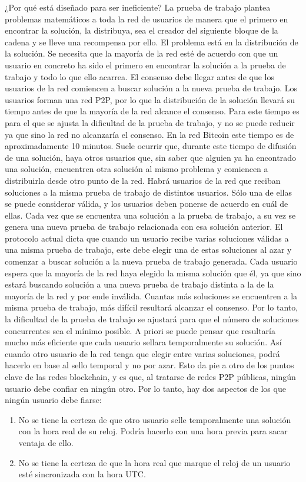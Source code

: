 ¿Por qué está diseñado para ser ineficiente? La prueba de trabajo plantea problemas matemáticos a toda la red de usuarios de manera que el primero en encontrar la solución, la distribuya, sea el creador del siguiente bloque de la cadena y se lleve una recompensa por ello. El problema está en la distribución de la solución. Se necesita que la mayoría de la red esté de acuerdo con que un usuario en concreto ha sido el primero en encontrar la solución a la prueba de trabajo y todo lo que ello acarrea. El consenso debe llegar antes de que los usuarios de la red comiencen a buscar solución a la nueva prueba de trabajo. Los usuarios forman una red P2P, por lo que la distribución de la solución llevará su tiempo antes de que la mayoría de la red alcance el consenso. Para este tiempo es para el que se ajusta la dificultad de la prueba de trabajo, y no se puede reducir ya que sino la red no alcanzaría el consenso. En la red Bitcoin este tiempo es de aproximadamente 10 minutos. Suele ocurrir que, durante este tiempo de difusión de una solución, haya otros usuarios que, sin saber que alguien ya ha encontrado una solución, encuentren otra solución al mismo problema y comiencen a distribuirla desde otro punto de la red. Habrá usuarios de la red que reciban soluciones a la misma prueba de trabajo de distintos usuarios. Sólo una de ellas se puede considerar válida, y los usuarios deben ponerse de acuerdo en cuál de ellas. Cada vez que se encuentra una solución a la prueba de trabajo, a su vez se genera una nueva prueba de trabajo relacionada con esa solución anterior. El protocolo actual dicta que cuando un usuario recibe varias soluciones válidas a una misma prueba de trabajo, este debe elegir una de estas soluciones al azar y comenzar a buscar solución a la nueva prueba de trabajo generada. Cada usuario espera que la mayoría de la red haya elegido la misma solución que él, ya que sino estará buscando solución a una nueva prueba de trabajo distinta a la de la mayoría de la red y por ende inválida. Cuantas más soluciones se encuentren a la misma prueba de trabajo, más difícil resultará alcanzar el consenso. Por lo tanto, la dificultad de la prueba de trabajo se ajustará para que el número de soluciones concurrentes sea el mínimo posible.
A priori se puede pensar que resultaría mucho más eficiente que cada usuario sellara temporalmente su solución. Así cuando otro usuario de la red tenga que elegir entre varias soluciones, podrá hacerlo en base al sello temporal y no por azar. Esto da pie a otro de los puntos clave de las redes blockchain, y es que, al tratarse de redes P2P públicas, ningún usuario debe confiar en ningún otro. Por lo tanto, hay dos aspectos de los que ningún usuario debe fiarse:
\begin{enumerate}
	\item No se tiene la certeza de que otro usuario selle temporalmente una solución con la hora real de su reloj. Podría hacerlo con una hora previa para sacar ventaja de ello.
	\item No se tiene la certeza de que la hora real que marque el reloj de un usuario esté sincronizada con la hora UTC.
\end{enumerate}

